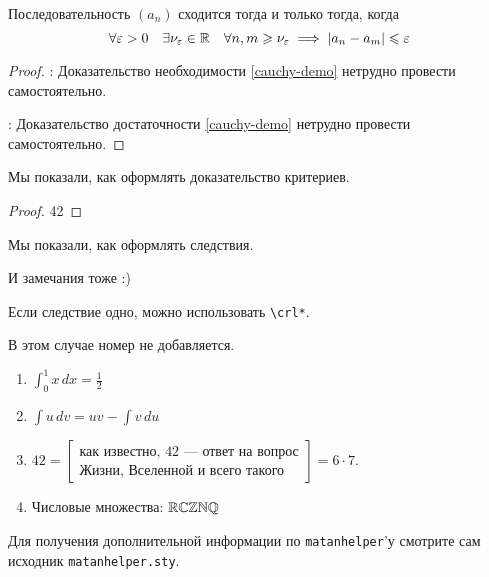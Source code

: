 \documentclass[../../main.tex]{subfiles}
\begin{document}
\begin{thm} Последовательность $(a_n)$ сходится тогда и только 
тогда, когда
\begin{equation}
\forall \varepsilon > 0 \quad \exists \nu_\varepsilon \in \mathbb{R} \quad \forall n, m \geqslant \nu_\varepsilon 
\implies \left|{a_n - a_m}\right| \leqslant \varepsilon
\label{cauchy-demo}
\end{equation}
\end{thm}
\begin{proof}
 \;

 \nec: Доказательство необходимости \eqref{cauchy-demo} нетрудно провести 
 самостоятельно.
 
 \suff: Доказательство достаточности \eqref{cauchy-demo} нетрудно провести 
 самостоятельно.
\end{proof}

\begin{crl}
 Мы показали, как оформлять доказательство критериев.
\end{crl}

\begin{proof}
 42
\end{proof}

\begin{crl}
 Мы показали, как оформлять следствия.
\end{crl}

\begin{rem}
 И замечания тоже :)
\end{rem}

\begin{thm}
 Если следствие одно, можно использовать \texttt{\textbackslash crl*}.
\end{thm}

\begin{crl*}
 В этом случае номер не добавляется.
\end{crl*}

\begin{exmps}
\begin{enumerate}
 \;

 \item $\displaystyle \int_0^1 x\,dx = \frac12$
 
 \item $\displaystyle \int u\,dv = uv - \int v\,du$
 
 \item $42 = \left[\begin{array}{c}\text{как известно, $42$~--- ответ на 
 вопрос} \\ \text{Жизни, Вселенной и всего такого}\end{array}\right] = 6\cdot 
 7$.
 
 \item Числовые множества: $\mathbb{R} \mathbb{C} \mathbb{Z} \mathbb{N} \mathbb{Q}$
\end{enumerate}
\end{exmps}

\begin{lem}
 Для получения дополнительной информации по \texttt{matanhelper}'у смотрите 
 сам исходник \texttt{matanhelper.sty}.
\end{lem}
\end{document}

